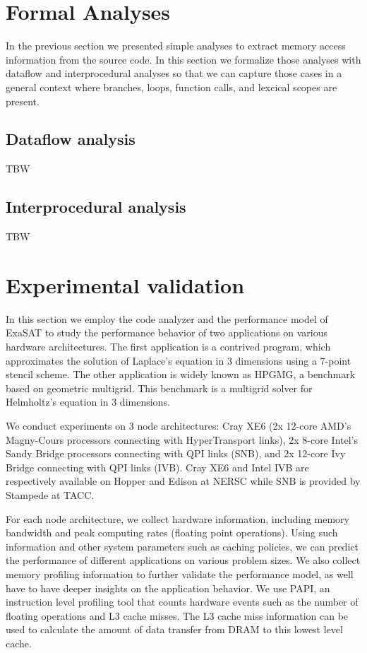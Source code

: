 \documentclass{article}
\begin{document}
\section{Formal Analyses}
In the previous section we presented simple analyses to extract memory access information from the source code.
In this section we formalize those analyses with dataflow and interprocedural analyses so that we can capture those cases in a general context where branches, loops, function calls, and lexcical scopes are present.


\subsection{Dataflow analysis}
TBW

\subsection{Interprocedural analysis}
TBW

\section{Experimental validation}
In this section we employ the code analyzer and the performance model of ExaSAT to study the performance behavior of two applications on various hardware architectures.
The first application is a contrived program, which approximates the solution of Laplace's equation in 3 dimensions using a 7-point stencil scheme.
The other application is widely known as HPGMG, a benchmark based on geometric multigrid.
This benchmark is a multigrid solver for Helmholtz's equation in 3 dimensions.

We conduct experiments on 3 node architectures: Cray XE6 (2x 12-core AMD's Magny-Cours processors connecting with HyperTransport links), 2x 8-core Intel's Sandy Bridge processors connecting with QPI links (SNB), and 2x 12-core Ivy Bridge connecting with QPI links (IVB).
Cray XE6 and Intel IVB are respectively available on Hopper and Edison at NERSC while SNB is provided by Stampede at TACC.

For each node architecture, we collect hardware information, including memory bandwidth and peak computing rates (floating point operations).  
Using such information and other system parameters such as caching policies, we can predict the performance of different applications on various problem sizes.
We also collect memory profiling information to further validate the performance model, as well have to have deeper insights on the application behavior. 
We use PAPI, an instruction level profiling tool that counts hardware events such as the number of floating operations and L3 cache misses.
The L3 cache miss information can be used to calculate the amount of data transfer from DRAM to this lowest level cache.
\end{document}
